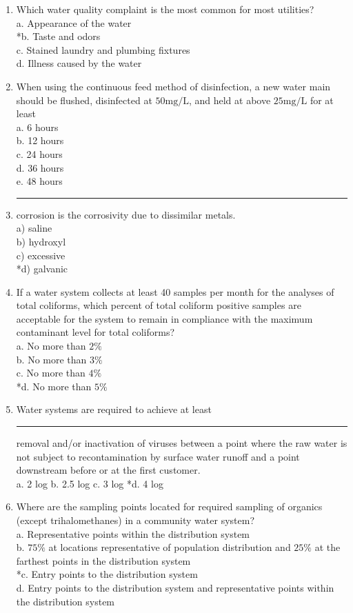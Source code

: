 \begin{enumerate}[1.]
  \item Which water quality complaint is the most common for most utilities?\\
a. Appearance of the water\\
*b. Taste and odors\\
c. Stained laundry and plumbing fixtures\\
d. Illness caused by the water\\

\item When using the continuous feed method of disinfection, a new water main should be flushed, disinfected at $50 \mathrm{mg} / \mathrm{L}$, and held at above $25 \mathrm{mg} / \mathrm{L}$ for at least\\
a. 6 hours\\
b. 12 hours\\
c. 24 hours\\
d. 36  hours\\
e. 48 hours\\

 \item \rule{2cm}{0.5pt}corrosion is the corrosivity due to dissimilar metals.\\
a) saline\\
b) hydroxyl\\
c) excessive\\
*d) galvanic\\

 \item If a water system collects at least 40 samples per month for the analyses of total coliforms, which percent of total coliform positive samples are acceptable for the system to remain in compliance with the maximum contaminant level for total coliforms?\\
a. No more than $2 \%$\\
b. No more than $3 \%$\\
c. No more than $4 \%$\\
*d. No more than $5 \%$\\
  \item Water systems are required to achieve at least \rule{1.5cm}{0.5pt} removal and/or inactivation of viruses between a point where the raw water is not subject to recontamination by surface water runoff and a point downstream before or at the first customer.\\
a. 2 log
b. 2.5 log
c. 3 log
*d. 4 log
  \item Where are the sampling points located for required sampling of organics (except trihalomethanes) in a community water system?\\
a. Representative points within the distribution system\\
b. $75 \%$ at locations representative of population distribution and $25 \%$ at the farthest points in the distribution system\\
*c. Entry points to the distribution system\\
d. Entry points to the distribution system and representative points within the distribution system 


\end{enumerate}
